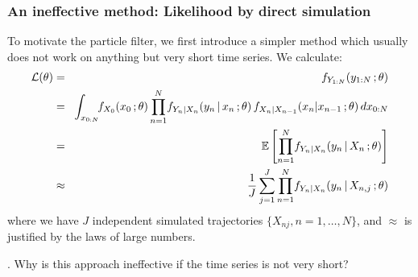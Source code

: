 \documentclass{beamer}\usepackage[]{graphicx}\usepackage[]{color}
\newcommand\answer[2]{#1} %
\begin{document}
\begin{frame}[fragile]

\frametitle{An ineffective method: Likelihood by direct simulation}

To motivate the particle filter, we first introduce a simpler method which usually does not work on anything but very short time series. We calculate:
\begin{eqnarray*}
\mathcal{L}(\theta)
&=&
f_{Y_{1:N}}(y_{1:N}\,;\theta)
\\
&=& \! \int_{x_{0:N}} \!\! f_{X_0}(x_0\,;\theta)\prod_{n=1}^{N}\!f_{Y_n|X_n}(y_n{\, | \,} x_n\,; \theta)\, f_{X_n|X_{n-1}}(x_n|x_{n-1}\,;\theta)\, dx_{0:N}
\\
&=& \mathbb{E}\left[ \prod_{n=1}^{N}\!f_{Y_n|X_n}(y_n{\, | \,} X_n\,; \theta) \right]
\\
&\approx& \frac{1}{J}\sum_{j=1}^J \prod_{n=1}^{N}\!f_{Y_n|X_n}(y_n{\, | \,} X_{n,j}\,; \theta) 
\end{eqnarray*}
where we have $J$ independent simulated trajectories $\{X_{nj},n=1,\dots,N\}$, and $\approx$ is justified by the laws of large numbers.

\myquestion. Why is this approach ineffective if the time series is not very short?

\answer{\vspace{20mm}}{todo}

\end{frame}
\end{document}
